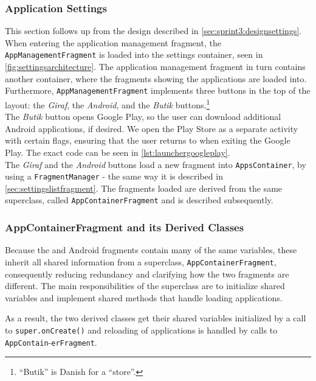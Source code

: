 \subsubsection{Application Settings}
This section follows up from the design described in \cref{sec:sprint3:designsettings}.
When entering the application management fragment, the \lstinline!AppManagementFragment! is loaded into the settings container, seen in \cref{fig:settingsarchitecture}.
The application management fragment in turn contains another container, where the fragments showing the applications are loaded into.
Furthermore, \lstinline!AppManagementFragment! implements three buttons in the top of the layout: the \textit{Giraf}, the \textit{Android}, and the \textit{Butik} buttons.\footnote{``Butik'' is Danish for a ``store''.}\\

The \textit{Butik} button opens Google Play, so the user can download additional Android applications, if desired. 
We open the Play Store as a separate activity with certain flags, ensuring that the user returns to \launcher when exiting the Google Play.
The exact code can be seen in \cref{lst:launchergoogleplay}.\\

The \textit{Giraf} and the \textit{Android} buttons load a new fragment into  \lstinline!AppsContainer!, by using a \lstinline!FragmentManager! - the same way it is described in \cref{sec:settingslistfragment}.
The fragments loaded are derived from the same superclass, called \lstinline|AppContainerFragment| and is described subsequently.

\subsubsection{AppContainerFragment and its Derived Classes}

Because the \giraf and Android fragments contain many of the same variables, these inherit all shared information from a superclass, \lstinline!AppContainerFragment!, consequently reducing redundancy and clarifying how the two fragments are different.
The main responsibilities of the superclass are to initialize shared variables and implement shared methods that handle loading applications.

As a result, the two derived classes get their shared variables initialized by a call to \lstinline!super.onCreate()! and reloading of applications is handled by calls to \lstinline!AppContain!-\lstinline!erFragment!. \\

